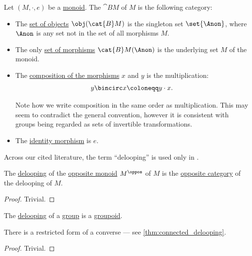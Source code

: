 \begin{definition}\label{def:monoid_delooping}
  Let \( (M, \cdot, e) \) be a \hyperref[def:monoid]{monoid}. The  \( \cat{B} M \) of \( M \) is the following category:
  \begin{itemize}
    \item The \hyperref[def:category/objects]{set of objects} \( \obj(\cat{B} M) \) is the singleton set \( \set{ \Anon } \), where \( \Anon \) is any set not in the set of all morphisms \( M \).

    \item The only \hyperref[def:category/morphisms]{set of morphisms} \( \cat{B} M(\Anon) \) is the underlying set \( M \) of the monoid.

    \item The \hyperref[def:category/composition]{composition of the morphisms} \( x \) and \( y \) is the multiplication:
    \begin{equation*}
      y \bincirc x \coloneqq y \cdot x.
    \end{equation*}

    Note how we write composition in the same order as multiplication. This may seem to contradict the general convention, however it is consistent with groups being regarded as sets of invertible transformations.

    \item The \hyperref[def:category/identity]{identity morphism} is \( e \).
  \end{itemize}
\end{definition}
\begin{comments}
  \item Across our cited literature, the term \enquote{delooping} is used only in \cite[10]{Perrone2024StartingCategoryTheory}.
\end{comments}

\begin{proposition}\label{thm:delooping_of_opposite_monoid}
  The \hyperref[def:monoid_delooping]{delooping} of the \hyperref[def:monoid/opposite]{opposite monoid} \( M^\oppos \) of \( M \) is the \hyperref[def:opposite_category]{opposite category} of the delooping of \( M \).
\end{proposition}
\begin{proof}
  Trivial.
\end{proof}

\begin{proposition}\label{thm:delooping_of_group}
  The \hyperref[def:monoid_delooping]{delooping} of a \hyperref[def:group]{group} is a \hyperref[def:groupoid]{groupoid}.
\end{proposition}
\begin{comments}
  \item There is a restricted form of a converse --- see \cref{thm:connected_delooping}.
\end{comments}
\begin{proof}
  Trivial.
\end{proof}

